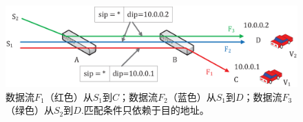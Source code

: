 %
%



\begin{figure} [t]
\begin{center}
\includegraphics[width=1\columnwidth]{figures/fig-6-31.eps}
\caption{数据流$F_{1}$（红色）从$S_{1}$到$C$；数据流$F_{2}$（蓝色）从$S_{1}$到$D$；数据流$F_{3}$（绿色）从$S_{2}$到$D$.匹配条件只依赖于目的地址。} \label{fig6}
\end{center}
\end{figure}



